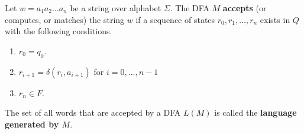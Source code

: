   \begin{definition}
    Let $w = a_1 a_2 \ldots a_n$ be a string over alphabet $\Sigma$. The DFA $M$ \textbf{accepts} (or computes, or matches) the string $w$ if a sequence of states $r_0, r_1, \ldots, r_n$ exists in $Q$ with the following conditions. 
    \begin{enumerate}
      \item $r_0 = q_0$. 
      \item $r_{i+1} = \delta(r_i, a_{i+1})$ for $i = 0, \ldots, n-1$ 
      \item $r_n \in F$. 
    \end{enumerate}
    The set of all words that are accepted by a DFA $L(M)$ is called the \textbf{language generated by $M$}. 
  \end{definition}

